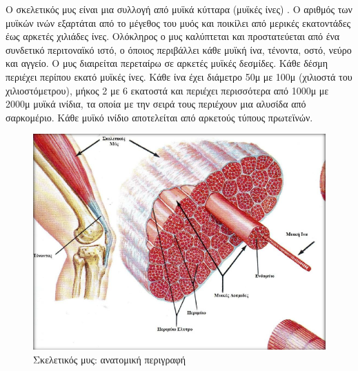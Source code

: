 Ο σκελετικός μυς είναι μια συλλογή από μυϊκά κύτταρα (μυϊκές ίνες) \cite{zirinoglou}. Ο αριθμός των μυϊκών ινών εξαρτάται από το μέγεθος του μυός και ποικίλει από μερικές εκατοντάδες έως αρκετές χιλιάδες ίνες. Ολόκληρος ο μυς καλύπτεται και προστατεύεται από ένα συνδετικό περιτοναϊκό ιστό, ο όποιος περιβάλλει κάθε μυϊκή ίνα, τένοντα, οστό, νεύρο και αγγείο. Ο μυς διαιρείται περεταίρω σε αρκετές μυϊκές δεσμίδες. Κάθε δέσμη περιέχει περίπου εκατό μυϊκές ίνες. Κάθε ίνα έχει διάμετρο 50μ με 100μ (χιλιοστά του χιλιοστόμετρου), μήκος 2 με 6 εκατοστά και περιέχει περισσότερα από 1000μ με 2000μ μυϊκά ινίδια, τα οποία με την σειρά τους περιέχουν μια αλυσίδα από σαρκομέριο. Κάθε μυϊκό ινίδιο αποτελείται από αρκετούς τύπους πρωτεϊνών.

\begin{figure}[H]
    \centering
    \includegraphics[width=.7\textwidth, height=0.4\textheight]{musculoskeletal/fig/muscle-fysiology.png}
    \caption{Σκελετικός μυς: ανατομική περιγραφή\protect\footnotemark}
    \label{fig:muscle-fysiology}
\end{figure}

